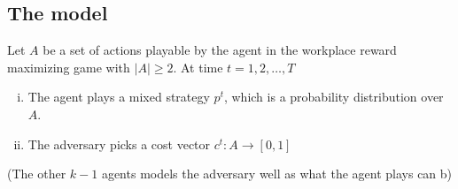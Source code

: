 \documentclass[a4paper,10pt]{article}
\theoremstyle{definition}
\begin{document}
\subsection*{The model} 
Let $A$ be a set of actions playable by the agent in the workplace reward maximizing game with $|A|\geq 2$. At time $t=1,2,\ldots, T$
\begin{enumerate}[(i)]
\item The agent plays a mixed strategy $p^t$, which is a probability distribution over $A$.
\item The adversary picks a cost vector $c^t: A \to [0,1]$
\end{enumerate}

(The other $k-1$ agents models the adversary well as what the agent plays can b)


























































 

\end{document}
